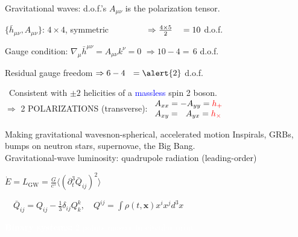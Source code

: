 \documentclass[xcolor=dvipsnames,handout,t]{beamer}
\newcommand{\red}[1]{\textcolor{red}{#1}}
\newcommand{\bl}[1]{\textcolor{blue}{#1}}
\newcommand{\f}{\frac}
\begin{document}
\begin{frame}{Gravitational waves: d.o.f.'s}
$A_{\mu\nu} $ is the polarization tensor.
\begin{itemize}
  {\item $\{ \bar{h}_{\mu\nu}, A_{\mu\nu} \}$: $4\times4$, symmetric {$\hspace{1.5cm}\Rightarrow \f{4\times 5}{2}\ \ \ = 10$ d.o.f.}}
  {\item Gauge condition: $\nabla_\mu \bar{h}^{\mu\nu} =  A_{\mu\nu} k^\nu= 0$ {$\Rightarrow10-4 = \, 6$ d.o.f.}}
  {\item Residual gauge freedom \hspace{2.25cm} {$\Rightarrow 6-4 \ \ = \alert{2}$ \alert{d.o.f.}}}
 \end{itemize}
{\quad \ Consistent with $\pm 2$ helicities of a \bl{massless} spin 2 boson.\\}
{$\Rightarrow$ \alert{2} POLARIZATIONS (\alert{transverse}): {$\begin{array}{l}A_{xx}=-A_{yy} = \red{h_+}  \\ A_{xy}=\ \ A_{yx} = \red{h_\times}  \\ \end{array}$}}
\\
%
\end{frame} 
 

 \begin{frame}{Making gravitational waves}{non-spherical, accelerated motion}
  \alert{Inspirals}, GRBs, bumps on neutron stars, supernovae, the Big Bang. \\%
  Gravitational-wave luminosity: \alert{quadrupole} radiation (leading-order)
  \begin{center} $ \boxed{\dot{E}=L_\text{GW} = \f{G}{c^5} \langle (\partial_t^3 \bar{Q}_{ij})^2 \rangle}$\\
  \vspace{2mm}
  \begin{small}$ \quad \bar{Q}_{ij} = Q_{ij}-\frac{1}{3}\delta_{ij}Q^k_k, \quad Q^{ij} = \int \rho(t,{\mathbf x})x^i x^j d^3 x $ \end{small} \end{center}
  \textcolor{white}{{\bf Binary systems:} 2 points masses in circular orbit.}
\end{frame}
\end{document}
